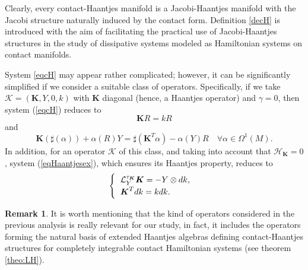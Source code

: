 \documentclass[10pt]{amsart}
\numberwithin{equation}{section}
\newcommand{\beq}{\begin{equation}}
\newcommand{\eeq}{\end{equation}}
\newcommand{\bs}{\boldsymbol}
\theoremstyle{definition}
\newtheorem{remark}{\textbf{Remark}}
\begin{document}
Clearly, every contact-Haantjes manifold is a Jacobi-Haantjes manifold with the Jacobi structure naturally induced by the contact form. Definition \ref{decH} is introduced with the aim of facilitating the practical use of Jacobi-Haantjes structures in the study of dissipative systems modeled as Hamiltonian systems on contact manifolds. 

\vspace{2mm}
System \eqref{eqcH} may appear rather complicated; however, it can be significantly simplified if we consider a suitable class of operators. Specifically, if we take $\bs{\mathcal{K}}=(\bs{K},Y,0,k)$ with $\bs{K}$ diagonal (hence, a Haantjes operator) and $\gamma=0$, then system (\ref{eqcH}) reduces to 
\beq
\bs{K}R=kR
\eeq
and
\begin{equation}
\label{eqreduced}
\bs{K}(\sharp(\alpha))+\alpha(R)Y=\sharp(\bs{K}^{T}\alpha)-\alpha(Y)R \quad \forall\alpha\in\Omega^{1}(M).
\end{equation}
In addition, for an operator $\bs{\mathcal{K}}$ of this class, and taking into account that $\mathcal{H}_{\bs{K}}=0$, system (\ref{eqHaantjesex}), which ensures its Haantjes property, reduces to
\begin{equation}
\label{eqreducedHaantjesex}
\begin{cases} \hspace{2mm}
\mathcal{L}_{Y}^{\tau_{\bs{K}}}\bs{K}=-Y\otimes dk, \\ \hspace{2mm}
\bs{K}^{T}dk=kdk.
\end{cases}
\end{equation}

\begin{remark}
It is worth mentioning that the kind of operators considered in the previous analysis is really relevant for our study, in fact, it includes the operators forming the natural basis of extended Haantjes algebras defining contact-Haantjes structures for completely integrable contact Hamiltonian systems (see theorem \ref{theo:LH}).
\end{remark}
\end{document}
